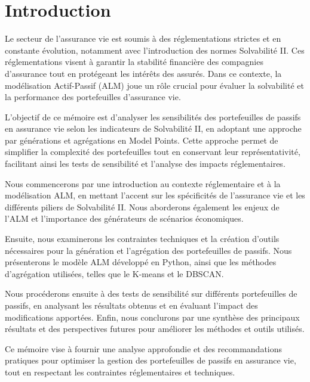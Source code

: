 \chapter{Introduction}

Le secteur de l'assurance vie est soumis à des réglementations strictes et en constante évolution, notamment avec l'introduction des normes Solvabilité II. Ces réglementations visent à garantir la stabilité financière des compagnies d'assurance tout en protégeant les intérêts des assurés. Dans ce contexte, la modélisation Actif-Passif (ALM) joue un rôle crucial pour évaluer la solvabilité et la performance des portefeuilles d'assurance vie.

L'objectif de ce mémoire est d'analyser les sensibilités des portefeuilles de passifs en assurance vie selon les indicateurs de Solvabilité II, en adoptant une approche par générations et agrégations en Model Points. Cette approche permet de simplifier la complexité des portefeuilles tout en conservant leur représentativité, facilitant ainsi les tests de sensibilité et l'analyse des impacts réglementaires.

Nous commencerons par une introduction au contexte réglementaire et à la modélisation ALM, en mettant l'accent sur les spécificités de l'assurance vie et les différents piliers de Solvabilité II. Nous aborderons également les enjeux de l'ALM et l'importance des générateurs de scénarios économiques.

Ensuite, nous examinerons les contraintes techniques et la création d'outils nécessaires pour la génération et l'agrégation des portefeuilles de passifs. Nous présenterons le modèle ALM développé en Python, ainsi que les méthodes d'agrégation utilisées, telles que le K-means et le DBSCAN.

Nous procéderons ensuite à des tests de sensibilité sur différents portefeuilles de passifs, en analysant les résultats obtenus et en évaluant l'impact des modifications apportées. Enfin, nous conclurons par une synthèse des principaux résultats et des perspectives futures pour améliorer les méthodes et outils utilisés.

Ce mémoire vise à fournir une analyse approfondie et des recommandations pratiques pour optimiser la gestion des portefeuilles de passifs en assurance vie, tout en respectant les contraintes réglementaires et techniques.